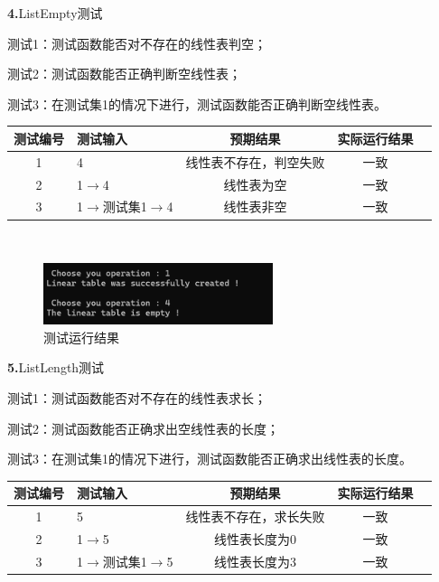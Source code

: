 \documentclass[supercite]{Experimental_Report}
\theoremstyle{definition}
\begin{document}
\noindent\textbf{ 4.}ListEmpty测试

测试1：测试函数能否对不存在的线性表判空；

测试2：测试函数能否正确判断空线性表；

测试3：在测试集1的情况下进行，测试函数能否正确判断空线性表。

\vspace{0.5em}

\begin{tabular}{|c|l|c|c|c|}
	\hline
	测试编号 & 测试输入 & 预期结果 & 实际运行结果 \\
	\hline
	1 & 4 & 线性表不存在，判空失败 & 一致 \\
	\hline
	2 & 1$\rightarrow$4 & 线性表为空 & 一致 \\
	\hline
	3 & 1$\rightarrow$测试集1$\rightarrow$4 & 线性表非空 & 一致 \\
	\hline
\end{tabular}

~\

 \begin{figure}[H]
 	\centering
 	\includegraphics[width=0.6\textwidth]{images/线性表测试4.png}
 	\caption{测试运行结果}
 	\label{txlab}
 \end{figure}


\noindent\textbf{ 5.}ListLength测试


测试1：测试函数能否对不存在的线性表求长；

测试2：测试函数能否正确求出空线性表的长度；

测试3：在测试集1的情况下进行，测试函数能否正确求出线性表的长度。

\vspace{0.5em}

\begin{tabular}{|c|l|c|c|c|}
	\hline
	测试编号 & 测试输入 & 预期结果 & 实际运行结果 \\
	\hline
	1 & 5 & 线性表不存在，求长失败 & 一致 \\
	\hline
	2 & 1$\rightarrow$5 & 线性表长度为0 & 一致 \\
	\hline
	3 & 1$\rightarrow$测试集1$\rightarrow$5 & 线性表长度为3 & 一致 \\
	\hline
\end{tabular}

~\
\end{document}
